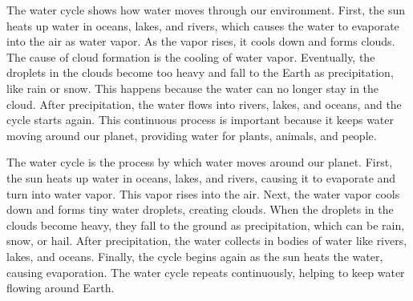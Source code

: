 \documentclass[12pt]{article}
\begin{document}
\begin{tcolorbox}[colframe=black!60, colback=white, 
coltitle=black, colbacktitle=black!15, fonttitle=\bfseries\Large, 
title=Text 1: The Importance of the Water Cycle, halign title=center, left=10pt, right=10pt, top=10pt, bottom=15pt]

The water cycle shows how water moves through our environment. First, the sun heats up water in oceans, lakes, and rivers, which causes the water to evaporate into the air as water vapor. As the vapor rises, it cools down and forms clouds. The cause of cloud formation is the cooling of water vapor. Eventually, the droplets in the clouds become too heavy and fall to the Earth as precipitation, like rain or snow. This happens because the water can no longer stay in the cloud. After precipitation, the water flows into rivers, lakes, and oceans, and the cycle starts again. This continuous process is important because it keeps water moving around our planet, providing water for plants, animals, and people.

 
\end{tcolorbox}

\vspace{2cm}
\begin{tcolorbox}[colframe=black!60, colback=white, 
coltitle=black, colbacktitle=black!15, fonttitle=\bfseries\Large, 
title=Text 2: The Water Cycle Process, halign title=center, left=10pt, right=10pt, top=10pt, bottom=15pt]

The water cycle is the process by which water moves around our planet. First, the sun heats up water in oceans, lakes, and rivers, causing it to evaporate and turn into water vapor. This vapor rises into the air. Next, the water vapor cools down and forms tiny water droplets, creating clouds. When the droplets in the clouds become heavy, they fall to the ground as precipitation, which can be rain, snow, or hail. After precipitation, the water collects in bodies of water like rivers, lakes, and oceans. Finally, the cycle begins again as the sun heats the water, causing evaporation. The water cycle repeats continuously, helping to keep water flowing around Earth.

 
\end{tcolorbox}


\vspace{1em}
\end{document}
